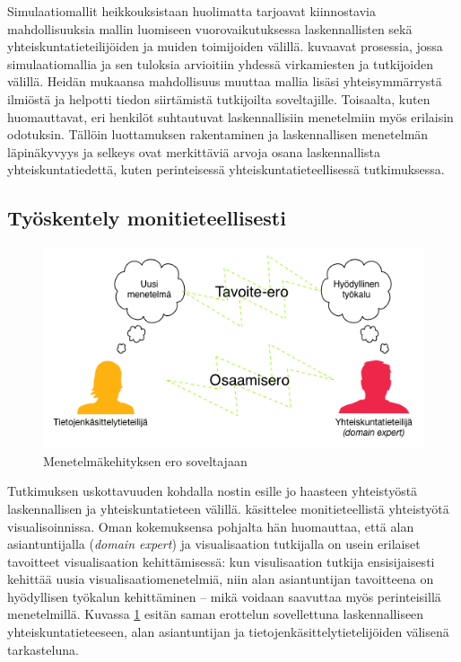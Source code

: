 \documentclass[finnish,gradu,twoside,12pt]{tktltiki}
\begin{document}
{Simulaatiomallit heikkouksistaan huolimatta tarjoavat kiinnostavia mahdollisuuksia mallin luomiseen vuorovaikutuksessa laskennallisten sekä yhteiskuntatieteilijöiden ja muiden toimijoiden välillä. \citet{Milne2014} kuvaavat prosessia, jossa simulaatiomallia ja sen tuloksia arvioitiin yhdessä virkamiesten ja tutkijoiden välillä. Heidän mukaansa mahdollisuus muuttaa mallia lisäsi yhteisymmärrystä ilmiöstä ja helpotti tiedon siirtämistä tutkijoilta soveltajille. Toisaalta, kuten \citet{Saunders-Newton2001a} huomauttavat, eri henkilöt suhtautuvat laskennallisiin menetelmiin myös erilaisin odotuksin. Tällöin luottamuksen rakentaminen ja laskennallisen menetelmän läpinäkyvyys ja selkeys ovat merkittäviä arvoja osana laskennallista yhteiskuntatiedettä, kuten perinteisessä yhteiskuntatieteellisessä tutkimuksessa.

\subsection{Työskentely monitieteellisesti}

\begin{figure}

\includegraphics[width=.6\textwidth]{images/monitieteellisyys_ongelma.png} 
\caption{Menetelmäkehityksen ero soveltajaan \citep[mukaillen][7]{Wijk2006}}
\label{fig:domain_expert_vs_computation_specialist}

\end{figure}

Tutkimuksen uskottavuuden kohdalla nostin esille jo haasteen yhteistyöstä laskennallisen ja yhteiskuntatieteen välillä. \citet{Wijk2006} käsittelee monitieteellistä yhteistyötä visualisoinnissa. Oman kokemuksensa pohjalta hän huomauttaa, että alan asiantuntijalla (\textit{domain expert}) ja visualisaation tutkijalla on usein erilaiset tavoitteet visualisaation kehittämisessä: kun visulisaation tutkija ensisijaisesti kehittää uusia visualisaatiomenetelmiä, niin alan asiantuntijan tavoitteena on hyödyllisen työkalun kehittäminen -- mikä voidaan saavuttaa myös perinteisillä menetelmillä. Kuvassa \ref{fig:domain_expert_vs_computation_specialist} esitän saman erottelun sovellettuna laskennalliseen yhteiskuntatieteeseen, alan asiantuntijan ja tietojenkäsittelytietelijöiden välisenä tarkasteluna.

}
\end{document}
